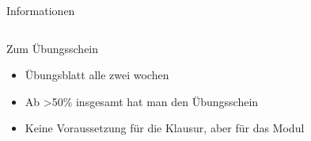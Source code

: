 {\begin{frame}{Informationen}
\begin{columns}
\begin{column}{0.5\textwidth}
			\begin{block}{Zum Übungsschein}
				\begin{itemize}
					\item Übungsblatt alle zwei wochen
					\item Ab >50\% insgesamt hat man den Übungsschein
					\item Keine Voraussetzung für die Klausur, aber für das Modul
				\end{itemize}
			\end{block}
			
		\end{column}
	\end{columns}
	
\end{frame}

}{}